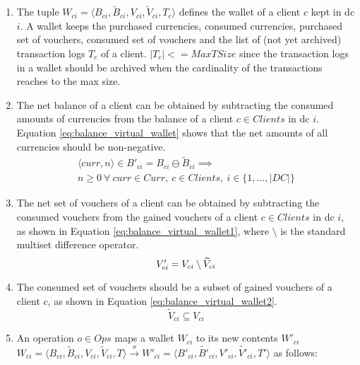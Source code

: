 \begin{enumerate}
	\item The tuple $W_{ci} = \langle B_{ci}, \widetilde{B}_{ci}, V_{ci}, \widetilde{V}_{ci}, T_{c} \rangle$ defines the wallet of a client $c$ kept in \gls{dc} $i$. A wallet keeps the purchased currencies, consumed currencies, purchased set of vouchers, consumed set of vouchers and the list of (not yet archived) transaction logs $T_{c}$ of a client. $|T_{c}| <= MaxTSize$ since the transaction logs in a wallet should be archived when the cardinality of the transactions reaches to the max size.

	\item The net balance of a client can be obtained by subtracting the consumed amounts of currencies from the balance of a client $c \in Clients$ in \gls{dc} $i$. Equation \ref{eq:balance_virtual_wallet} shows that the net amounts of all currencies should be non-negative.
	\begin{multline}  \label{eq:balance_virtual_wallet}
		\langle curr, n \rangle \in B'_{ci} = B_{ci} \ominus \widetilde{B}_{ci} \implies \\
		n \ge 0 ~ \forall ~  curr \in Curr, ~  c \in Clients,  ~  i \in \{1,\dots, |DC|\} 
	\end{multline}

	\item The net set of vouchers of a client can be obtained by subtracting the consumed vouchers from the gained vouchers of a client $c \in Clients$ in \gls{dc} $i$, as shown in Equation \ref{eq:balance_virtual_wallet1}, where $\setminus$ is the standard multiset difference operator.
	\begin{equation} \label{eq:balance_virtual_wallet1}
		V'_{ci} = V_{ci} \setminus \widetilde{V}_{ci} \\
	\end{equation}
  
	\item The consumed set of vouchers should be a subset of gained vouchers of a client $c$, as shown in Equation \ref{eq:balance_virtual_wallet2}.
	\begin{equation}  \label{eq:balance_virtual_wallet2}
		\widetilde{V}_{ci} \subseteq V_{ci}   
	\end{equation}
		
	\item An operation $o \in Ops$ maps a wallet $W_{ci}$ to its new contents $W'_{ci}$  $W_{ci} = \langle B_{ci}, \widetilde{B}_{ci}, V_{ci}, \widetilde{V}_{ci}, T \rangle \overset{o}{\rightarrow} W'_{ci} = \langle B'_{ci}, \widetilde{B'}_{ci}, V'_{ci}, \widetilde{V'}_{ci}, T' \rangle$ as follows: 
	

\end{enumerate}
